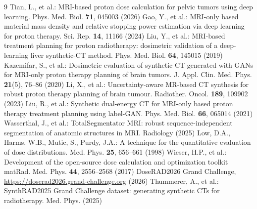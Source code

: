 \documentclass{llncs}
\begin{document}
\clearpage
\begin{thebibliography}{9}\small
{} Tian, L., et al.: MRI-based proton dose calculation for pelvic tumors using
deep learning. Phys. Med. Biol. \textbf{71}, 045003 (2026)
 Gao, Y., et al.: MRI-only based material mass density and relative stopping power
estimation via deep learning for proton therapy. Sci. Rep. \textbf{14}, 11166 (2024)
 Liu, Y., et al.: MRI-based treatment planning for proton radiotherapy: dosimetric
validation of a deep-learning liver synthetic-CT method. Phys. Med. Biol. \textbf{64}, 145015 (2019)
 Kazemifar, S., et al.: Dosimetric evaluation of synthetic CT generated with
GANs for MRI-only proton therapy planning of brain tumors. J. Appl. Clin. Med. Phys.
\textbf{21}(5), 76--86 (2020)
 Li, X., et al.: Uncertainty-aware MR-based CT synthesis for robust proton therapy
planning of brain tumour. Radiother. Oncol. \textbf{189}, 109902 (2023)
 Liu, R., et al.: Synthetic dual-energy CT for MRI-only based proton therapy
treatment planning using label-GAN. Phys. Med. Biol. \textbf{66}, 065014 (2021)
 Wasserthal, J., et al.: TotalSegmentator MRI: robust sequence-independent
segmentation of anatomic structures in MRI. Radiology (2025)
 Low, D.A., Harms, W.B., Mutic, S., Purdy, J.A.: A technique for the quantitative
evaluation of dose distributions. Med. Phys. \textbf{25}, 656--661 (1998)
 Wieser, H.P., et al.: Development of the open-source dose calculation and
optimization toolkit matRad. Med. Phys. \textbf{44}, 2556--2568 (2017)
 DoseRAD2026 Grand Challenge, \url{https://doserad2026.grand-challenge.org} (2026)
 Thummerer, A., et al.: SynthRAD2025 Grand Challenge dataset: generating
synthetic CTs for radiotherapy. Med. Phys. (2025)
\end{thebibliography}
\end{document}
